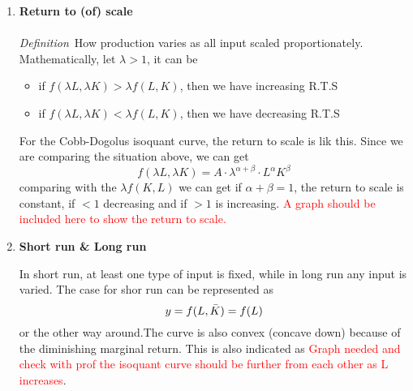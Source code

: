 \documentclass[10pt]{article}
\newenvironment{changemargin}[2]{%
  \begin{list}{}{%
    \setlength{\topsep}{0pt}%
    \setlength{\leftmargin}{#1}%
    \setlength{\rightmargin}{#2}%
    \setlength{\listparindent}{\parindent}%
    \setlength{\itemindent}{\parindent}%
    \setlength{\parsep}{\parskip}%
  }%
  \item[]}{\end{list}}
\begin{document}
\begin{changemargin}{-0.125in}{0in}
\begin{enumerate}
\begin{enumerate}
        \medskip
        
        \item \textbf{Return to (of)  scale}
        \\
        \\
        \textit{Definition}\,\,\,How production varies as all input scaled proportionately. Mathematically, let $\lambda > 1$, it can be 
        \begin{itemize}
            \item if $f(\lambda L, \lambda K) > \lambda f(L,K)$, then we have increasing R.T.S
            \item if $f(\lambda L, \lambda K) < \lambda f(L,K)$, then we have decreasing R.T.S
        \end{itemize}
        
        For the Cobb-Dogolus isoquant curve, the return to scale is lik this. Since we are comparing the situation above, we can get 
        \[
        f(\lambda L,\lambda K)= A\cdot \lambda^{\alpha+\beta} \cdot L ^\alpha K^\beta 
        \]
        comparing with the $\lambda f(K,L)$ we can get if $\alpha+\beta = 1$, the return to scale is constant, if $<1$ decreasing and if $>1$ is increasing. 
        \textcolor{red}{A graph should be included here to show the return to scale.}
        \\
        
        \item \textbf{Short run \& Long run}
        
        \medskip
        
        In short run, at least one type of input is fixed, while in long run any input is varied. The case for shor run can be represented as 
        \[
        y=f(L,\Bar{K}) = f(L)
        \]
        or the other way around.The curve is also convex (concave down) because of the diminishing marginal return. This is also indicated as \textcolor{red}{Graph needed and check with prof the isoquant curve should be further from each other as L increases}. 
        \\
        

\end{enumerate}
\end{enumerate}
\end{changemargin}
\end{document}
